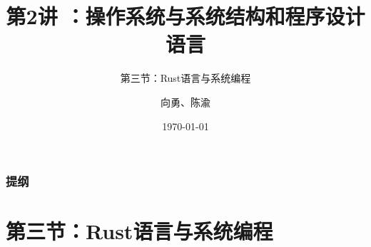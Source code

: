 


\title[第2讲]{第2讲 ：操作系统与系统结构和程序设计语言} %
\subtitle{第三节：Rust语言与系统编程}
\author{向勇、陈渝} %
\date{\today} %



\begin{frame}
\titlepage %
\end{frame}

\begin{frame}
\frametitle{提纲} %
\tableofcontents %
\end{frame}


\section{第三节：Rust语言与系统编程 } %

